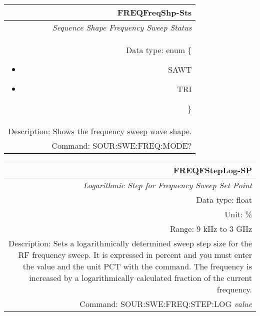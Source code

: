 \documentclass[openany]{article}
\begin{document}
		\begin{tabular}{N}
			\hline
			\bfseries FREQFreqShp-Sts \\ \hline
			\emph{Sequence Shape Frequency Sweep Status} \\
			Data type: enum \{\begin{itemize}[noitemsep]
				\small
				\item[] SAWT
				\item[] TRI
			\end{itemize}\} \\
			Description: Shows the frequency sweep wave shape. \\
			Command: SOUR:SWE:FREQ:MODE? \\

		\end{tabular}
%
		\begin{tabular}{N}
			\hline
			\bfseries FREQFStepLog-SP \\ \hline
			\emph{Logarithmic Step for Frequency Sweep Set Point} \\
			Data type: float \\
			Unit: \% \\
			Range: 9 kHz to 3 GHz \\
			Description: Sets a logarithmically determined sweep step size for the RF frequency sweep. It is expressed in percent and you must enter the value and the unit PCT with the command. The frequency is increased by a logarithmically calculated fraction of the current frequency. \\
			Command: SOUR:SWE:FREQ:STEP:LOG \emph{value} \\
			
		\end{tabular}
\end{document}
